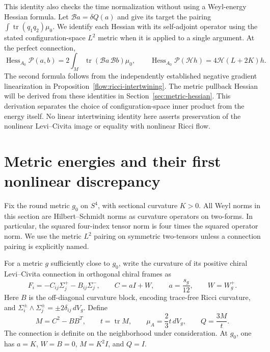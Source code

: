 \documentclass[11pt]{article}
\numberwithin{equation}{section}
\theoremstyle{definition}
\theoremstyle{remark}
\begin{document}
This identity also checks the time normalization without using a
Weyl-energy Hessian formula.  Let $\mathscr B a=\delta Q(a)$ and give
its target the pairing $\int\operatorname{tr}(q_1q_2)\mu_0$.
We identify each Hessian with its self-adjoint operator using the stated
configuration-space $L^2$ metric when it is applied to a single argument.
At the perfect connection,
\begin{equation}
 \operatorname{Hess}_{A_0}\mathcal P(a,b)
      =2\int_M\operatorname{tr}(\mathscr B a\,\mathscr B b)\mu_0,
 \qquad
 \operatorname{Hess}_{A_0}\mathcal P(\mathcal Hh)
      =4\mathcal H(L+2K)h.
 \label{flow:connection-hessian}
\end{equation}
The second formula follows from the independently established negative
gradient linearization in Proposition~\ref{flow:ricci-intertwining}.
The metric pullback Hessian will be derived from these identities in Section~\ref{sec:metric-hessian}. This derivation separates the choice of configuration-space inner product from the energy itself. No linear intertwining identity here asserts preservation of the nonlinear Levi--Civita image or equality with nonlinear Ricci flow.


\section[Metric energies and nonlinear discrepancy]{Metric energies and their first nonlinear discrepancy}
\label{sec:metric-energy}

Fix the round metric $g_0$ on $S^4$, with sectional curvature $K>0$.
All Weyl norms in this section are Hilbert--Schmidt norms as curvature
operators on two-forms. In particular, the squared four-index tensor norm
is four times the squared operator norm. We use the metric $L^2$ pairing
on symmetric two-tensors unless a connection pairing is explicitly named.

For a metric $g$ sufficiently close to $g_0$, write the curvature of its
positive chiral Levi--Civita connection in orthogonal chiral frames as
\begin{equation}\label{metric:curvature-blocks}
 F_i=-C_{ij}\Sigma_j^+-B_{ij}\Sigma_j^- ,\qquad
 C=aI+W,\qquad a=\frac{s_g}{12},\qquad W=W_g^+.
\end{equation}
Here $B$ is the off-diagonal curvature block, encoding trace-free Ricci
curvature, and
$\Sigma_i^\pm\wedge\Sigma_j^\pm=\pm2\delta_{ij}\,dV_g$.
Define
\begin{equation}\label{metric:M-Q}
 M=C^2-BB^T,\qquad t=\operatorname{tr}M,\qquad
 \mu_A=\frac23t\,dV_g,\qquad Q=\frac{3M}{t}.
\end{equation}
The connection is definite on the neighborhood under consideration.
At $g_0$, one has $a=K$, $W=B=0$, $M=K^2I$, and $Q=I$.
\end{document}
